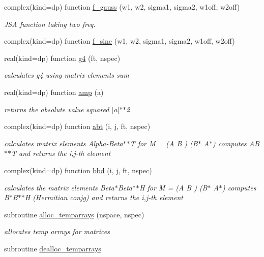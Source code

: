 \begin{DoxyCompactItemize}
complex(kind=dp) function \hyperlink{namespacemakeopticalelements_ae29454e6b6a33b50212c3af0c275173a}{f\+\_\+gauss} (w1, w2, sigma1, sigma2, w1off, w2off)
\begin{DoxyCompactList}\small\item\em J\+SA function taking two freq. \end{DoxyCompactList}\item 
complex(kind=dp) function \hyperlink{namespacemakeopticalelements_ac31d9c650a776cc4ebd4de3bcc370207}{f\+\_\+sine} (w1, w2, sigma1, sigma2, w1off, w2off)
\item 
real(kind=dp) function \hyperlink{namespacemakeopticalelements_af1a18704c55aa2efeb60157c81a80723}{g4} (ft, nspec)
\begin{DoxyCompactList}\small\item\em calculates g4 using matrix elements sum  \end{DoxyCompactList}\item 
real(kind=dp) function \hyperlink{namespacemakeopticalelements_a0649740479f47221d009b8d496b78c8b}{amp} (a)
\begin{DoxyCompactList}\small\item\em returns the absolute value squared $\vert$a$\vert$$\ast$$\ast$2 \end{DoxyCompactList}\item 
complex(kind=dp) function \hyperlink{namespacemakeopticalelements_a1b408449683f6bcc96ee25d4bbc1aa8b}{abt} (i, j, ft, nspec)
\begin{DoxyCompactList}\small\item\em calculates matrix elements Alpha-\/\+Beta$\ast$$\ast$T  for M = (A B ) (B$\ast$ A$\ast$) computes A\+B$\ast$$\ast$T and returns the i,j-\/th element \end{DoxyCompactList}\item 
complex(kind=dp) function \hyperlink{namespacemakeopticalelements_a7d0e54a1c7f830fd961f3c99d0a49b30}{bbd} (i, j, ft, nspec)
\begin{DoxyCompactList}\small\item\em calculates the matrix elements Beta$\ast$\+Beta$\ast$$\ast$H  for M = (A B ) (B$\ast$ A$\ast$) computes B$\ast$\+B$\ast$$\ast$H (Hermitian conjg) and returns the i,j-\/th element \end{DoxyCompactList}\item 
subroutine \hyperlink{namespacemakeopticalelements_aefda61530c80eccf75e7065015af413d}{alloc\+\_\+temparrays} (nspace, nspec)
\begin{DoxyCompactList}\small\item\em allocates temp arrays for matrices \end{DoxyCompactList}\item 
subroutine \hyperlink{namespacemakeopticalelements_aab212aad9e53b7ae643456f9bc0b68cb}{dealloc\+\_\+temparrays}
\end{DoxyCompactItemize}
